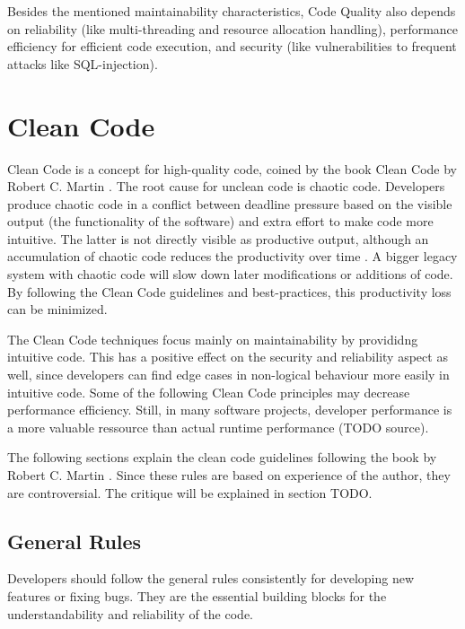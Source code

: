 Besides the mentioned maintainability characteristics, Code Quality also depends on reliability (like multi-threading and resource allocation handling), performance efficiency for efficient code execution, and security (like vulnerabilities to frequent attacks like SQL-injection).

\section{Clean Code}\label{sec:clean_code}
Clean Code is a concept for high-quality code, coined by the book Clean Code by Robert C. Martin \cite{martin_clean_2009}. The root cause for unclean code is chaotic code. Developers produce chaotic code in a conflict between deadline pressure based on the visible output (the functionality of the software) and extra effort to make code more intuitive. The latter is not directly visible as productive output, although an accumulation of chaotic code reduces the productivity over time \cite{martin_clean_2009}. A bigger legacy system with chaotic code will slow down later modifications or additions of code. By following the Clean Code guidelines and best-practices, this productivity loss can be minimized. 

The Clean Code techniques focus mainly on maintainability by provididng intuitive code. This has a positive effect on the security and reliability aspect as well, since developers can find edge cases in non-logical behaviour more easily in intuitive code. Some of the following Clean Code principles may decrease performance efficiency. Still, in many software projects, developer performance is a more valuable ressource than actual runtime performance (TODO source).


The following sections explain the clean code guidelines following the book by Robert C. Martin \cite{martin_clean_2009}.
Since these rules are based on experience of the author, they are controversial. The critique will be explained in section TODO.

\subsection{General Rules}
Developers should follow the general rules consistently for developing new features or fixing bugs. They are the essential building blocks for the understandability and reliability of the code. 


